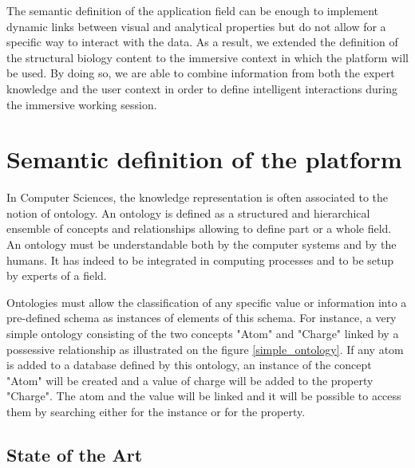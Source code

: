 \documentclass{vgtc}                          %
\begin{document}
The semantic definition of the application field can be enough to implement dynamic links between visual and analytical properties but do not allow for a specific way to interact with the data. As a result, we extended the definition of the structural biology content to the immersive context in which the platform will be used.
By doing so, we are able to combine information from both the expert knowledge and the user context in order to define intelligent interactions during the immersive working session.


\section{Semantic definition of the platform}

In Computer Sciences, the knowledge representation is often associated to the notion of ontology. An ontology is defined as a structured and hierarchical ensemble of concepts and relationships allowing to define part or a whole field. An ontology must be understandable both by the computer systems and by the humans. It has indeed to be integrated in computing processes and to be setup by experts of a field.

Ontologies must allow the classification of any specific value or information into a pre-defined schema as instances of elements of this schema. For instance, a very simple ontology consisting of the two concepts "Atom" and "Charge" linked by a possessive relationship as illustrated on the figure \ref{simple_ontology}.
If any atom is added to a database defined by this ontology, an instance of the concept "Atom" will be created and a value of charge will be added to the property "Charge". The atom and the value will be linked and it will be possible to access them by searching either for the instance or for the property.

\subsection{State of the Art}
\end{document}
